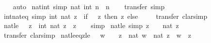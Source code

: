 \begin{isabellebody}
\ \ %
\endisadelimproof
%
\isatagproof
{}\isamarkupfalse%
\ auto%
\endisatagproof
{\isafoldproof}%
%
\isadelimproof
\isanewline
%
\endisadelimproof
\isanewline
{}\isamarkupfalse%
\ nat{\isacharunderscore}{\kern0pt}int\ {\isacharbrackleft}{\kern0pt}simp{\isacharbrackright}{\kern0pt}{\isacharcolon}{\kern0pt}\ {\isachardoublequoteopen}nat\ {\isacharparenleft}{\kern0pt}int\ n{\isacharparenright}{\kern0pt}\ {\isacharequal}{\kern0pt}\ n{\isachardoublequoteclose}\isanewline
%
\isadelimproof
\ \ %
\endisadelimproof
%
\isatagproof
{}\isamarkupfalse%
\ transfer\ simp%
\endisatagproof
{\isafoldproof}%
%
\isadelimproof
\isanewline
%
\endisadelimproof
\isanewline
{}\isamarkupfalse%
\ int{\isacharunderscore}{\kern0pt}nat{\isacharunderscore}{\kern0pt}eq\ {\isacharbrackleft}{\kern0pt}simp{\isacharbrackright}{\kern0pt}{\isacharcolon}{\kern0pt}\ {\isachardoublequoteopen}int\ {\isacharparenleft}{\kern0pt}nat\ z{\isacharparenright}{\kern0pt}\ {\isacharequal}{\kern0pt}\ {\isacharparenleft}{\kern0pt}if\ {}\ {\isasymle}\ z\ then\ z\ else\ {}{\isacharparenright}{\kern0pt}{\isachardoublequoteclose}\isanewline
%
\isadelimproof
\ \ %
\endisadelimproof
%
\isatagproof
{}\isamarkupfalse%
\ transfer\ clarsimp%
\endisatagproof
{\isafoldproof}%
%
\isadelimproof
\isanewline
%
\endisadelimproof
\isanewline
{}\isamarkupfalse%
\ nat{\isacharunderscore}{\kern0pt}{}{\isacharunderscore}{\kern0pt}le{\isacharcolon}{\kern0pt}\ {\isachardoublequoteopen}{}\ {\isasymle}\ z\ {\isasymLongrightarrow}\ int\ {\isacharparenleft}{\kern0pt}nat\ z{\isacharparenright}{\kern0pt}\ {\isacharequal}{\kern0pt}\ z{\isachardoublequoteclose}\isanewline
%
\isadelimproof
\ \ %
\endisadelimproof
%
\isatagproof
{}\isamarkupfalse%
\ simp%
\endisatagproof
{\isafoldproof}%
%
\isadelimproof
\isanewline
%
\endisadelimproof
\isanewline
{}\isamarkupfalse%
\ nat{\isacharunderscore}{\kern0pt}le{\isacharunderscore}{\kern0pt}{}\ {\isacharbrackleft}{\kern0pt}simp{\isacharbrackright}{\kern0pt}{\isacharcolon}{\kern0pt}\ {\isachardoublequoteopen}z\ {\isasymle}\ {}\ {\isasymLongrightarrow}\ nat\ z\ {\isacharequal}{\kern0pt}\ {}{\isachardoublequoteclose}\isanewline
%
\isadelimproof
\ \ %
\endisadelimproof
%
\isatagproof
{}\isamarkupfalse%
\ transfer\ clarsimp%
\endisatagproof
{\isafoldproof}%
%
\isadelimproof
\isanewline
%
\endisadelimproof
\isanewline
{}\isamarkupfalse%
\ nat{\isacharunderscore}{\kern0pt}le{\isacharunderscore}{\kern0pt}eq{\isacharunderscore}{\kern0pt}zle{\isacharcolon}{\kern0pt}\ {\isachardoublequoteopen}{}\ {\isacharless}{\kern0pt}\ w\ {\isasymor}\ {}\ {\isasymle}\ z\ {\isasymLongrightarrow}\ nat\ w\ {\isasymle}\ nat\ z\ {\isasymlongleftrightarrow}\ w\ {\isasymle}\ z{\isachardoublequoteclose}\isanewline

\end{isabellebody}
